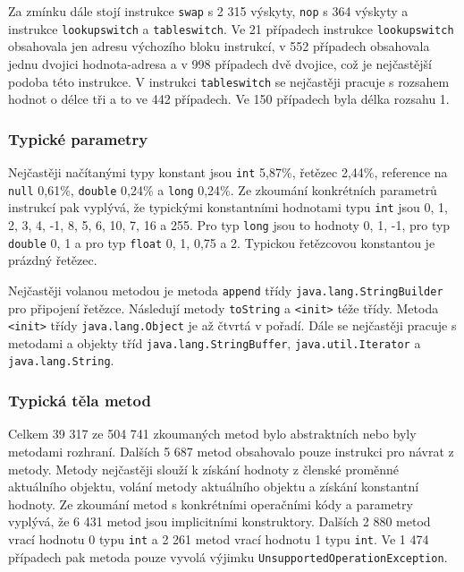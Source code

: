 Za zmínku dále stojí instrukce \texttt{swap} s 2 315 výskyty, \texttt{nop} s 364 výskyty a instrukce \texttt{lookupswitch} a \texttt{tableswitch}. Ve 21 případech instrukce \texttt{lookupswitch} obsahovala jen adresu výchozího bloku instrukcí, v 552 případech obsahovala jednu dvojici hodnota-adresa a v 998 případech dvě dvojice, což je nejčastější podoba této instrukce. V instrukci \texttt{tableswitch} se nejčastěji pracuje s rozsahem hodnot o délce tři a to ve 442 případech. Ve 150 případech byla délka rozsahu 1.

\subsubsection{Typické parametry}

Nejčastěji načítanými typy konstant jsou \texttt{int} 5,87\%, řetězec 2,44\%, reference na \texttt{null} 0,61\%, \texttt{double} 0,24\% a \texttt{long} 0,24\%.
Ze zkoumání konkrétních parametrů instrukcí pak vyplývá, že typickými konstantními hodnotami typu \texttt{int} jsou 0, 1, 2, 3, 4, -1, 8, 5, 6, 10, 7, 16 a 255. Pro typ \texttt{long} jsou to hodnoty 0, 1, -1, pro typ \texttt{double} 0, 1 a pro typ \texttt{float} 0, 1, 0,75 a 2. Typickou řetězcovou konstantou je prázdný řetězec. 

Nejčastěji volanou metodou je metoda \texttt{append} třídy \texttt{java.lang.StringBuilder} pro připojení řetězce. Následují metody \texttt{toString} a \texttt{<init>} téže třídy. Metoda \texttt{<init>} třídy \texttt{java.lang.Object} je až čtvrtá v pořadí. Dále se nejčastěji pracuje s metodami a objekty tříd \texttt{java.lang.StringBuffer}, \texttt{java.util.Iterator} a \texttt{java.lang.String}.

\subsubsection{Typická těla metod}

Celkem 39 317 ze 504 741 zkoumaných metod bylo abstraktních nebo byly metodami rozhraní. Dalších 5 687 metod obsahovalo pouze instrukci pro návrat z metody. Metody nejčastěji slouží k získání hodnoty z členské proměnné aktuálního objektu, volání metody aktuálního objektu a získání konstantní hodnoty. Ze zkoumání metod s konkrétními operačními kódy a parametry vyplývá, že 6 431 metod jsou implicitními konstruktory. Dalších 2 880 metod vrací hodnotu 0 typu \texttt{int} a 2 261 metod vrací hodnotu 1 typu \texttt{int}. Ve 1 474 případech pak metoda pouze vyvolá výjimku \texttt{UnsupportedOperationException}.


